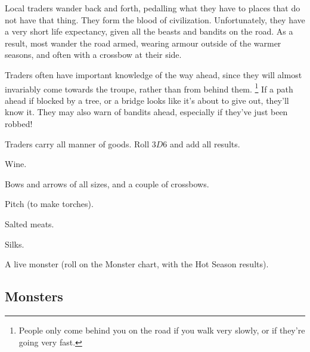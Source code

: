 \begin{multicols}{2}
\begin{multicols}{2}
Local traders wander back and forth, pedalling what they have to places that do not have that thing.
They form the blood of civilization.
Unfortunately, they have a very short life expectancy, given all the beasts and bandits on the road.
As a result, most wander the road armed, wearing armour outside of the warmer seasons, and often with a crossbow at their side.

Traders often have important knowledge of the way ahead, since they will almost invariably come towards the troupe, rather than from behind them.%
\footnote{People only come behind you on the road if you walk very slowly, or if they're going very fast.}
If a path ahead if blocked by a tree, or a bridge looks like it's about to give out, they'll know it.
They may also warn of bandits ahead, especially if they've just been robbed!

Traders carry all manner of goods.
Roll $3D6$ and add all results.

\begin{multicols}{2}
\begin{dlist}
  \item
  Wine.
  \item
  Bows and arrows of all sizes, and a couple of crossbows.
  \item
  Pitch (to make torches).
  \item
  Salted meats.
  \item
  Silks.
  \item
  A live monster (roll on the Monster chart, with the Hot Season results).
\end{dlist}
\end{multicols}

\subsection{Monsters}


\end{multicols}
\end{multicols}
